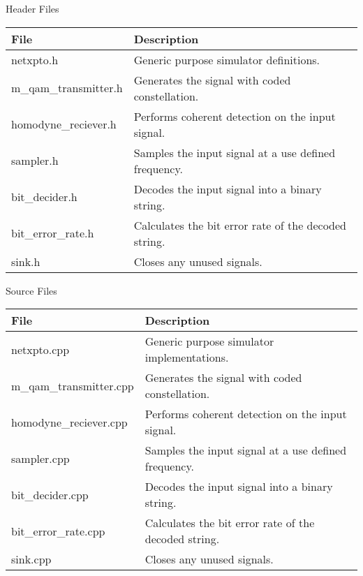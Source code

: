 \documentclass[a4paper]{article}
\begin{document}
Header Files
\begin{savenotes}
\begin{table}[H]
\centering
\begin{tabulary}{1.0\textwidth}{|L|L|}
\hline
\textbf{File}            & \textbf{Description} 				                  \\ \hline
netxpto.h                & Generic purpose simulator definitions.	              \\ \hline
m\_qam\_transmitter.h    & Generates the signal with coded constellation.       \\ \hline
homodyne\_reciever.h     & Performs coherent detection on the input signal.     \\ \hline
sampler.h                & Samples the input signal at a use defined frequency. \\ \hline
bit\_decider.h            & Decodes the input signal into a binary string.       \\ \hline
bit\_error\_rate.h       & Calculates the bit error rate of the decoded string. \\ \hline
sink.h                   & Closes any unused signals.                           \\ \hline
\end{tabulary}
\end{table}		
\end{savenotes}	
%
Source Files
\begin{table}[H]
\centering
\begin{tabulary}{1.0\textwidth}{|L|L|}
\hline
\textbf{File}              & \textbf{Description} 					             \\ \hline
netxpto.cpp                & Generic purpose simulator implementations.           \\ \hline
m\_qam\_transmitter.cpp    &  Generates the signal with coded constellation.      \\ \hline
homodyne\_reciever.cpp     & Performs coherent detection on the input signal.     \\ \hline
sampler.cpp                & Samples the input signal at a use defined frequency. \\ \hline
bit\_decider.cpp            & Decodes the input signal into a binary string.       \\ \hline
bit\_error\_rate.cpp       & Calculates the bit error rate of the decoded string. \\ \hline
sink.cpp                   & Closes any unused signals.                           \\ \hline
\end{tabulary}
\end{table}		
\end{document}
